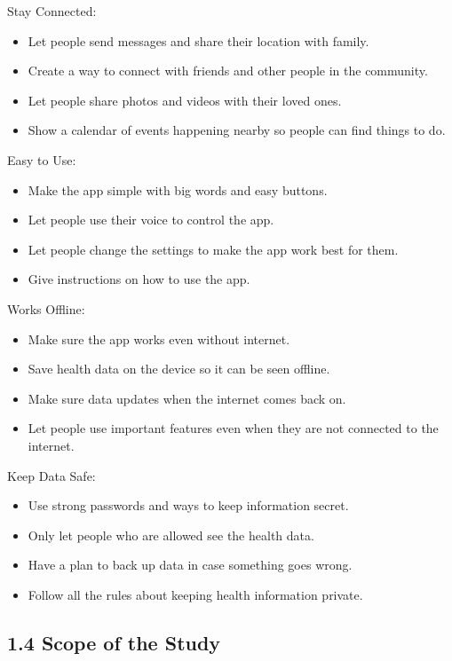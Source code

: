 \documentclass{article}
\begin{document}
Stay Connected:

\begin{itemize}
    \item Let people send messages and share their location with family.
    \item Create a way to connect with friends and other people in the community.
    \item Let people share photos and videos with their loved ones.
    \item Show a calendar of events happening nearby so people can find things to do.
\end{itemize}

Easy to Use:

\begin{itemize}
    \item Make the app simple with big words and easy buttons.
    \item Let people use their voice to control the app.
    \item Let people change the settings to make the app work best for them.
    \item Give instructions on how to use the app.
\end{itemize}

Works Offline:

\begin{itemize}
    \item Make sure the app works even without internet.
    \item Save health data on the device so it can be seen offline.
    \item Make sure data updates when the internet comes back on.
    \item Let people use important features even when they are not connected to the internet.
\end{itemize}

Keep Data Safe:

\begin{itemize}
    \item Use strong passwords and ways to keep information secret.
    \item Only let people who are allowed see the health data.
    \item Have a plan to back up data in case something goes wrong.
    \item Follow all the rules about keeping health information private.
\end{itemize}

\subsection*{1.4 Scope of the Study}
\end{document}
